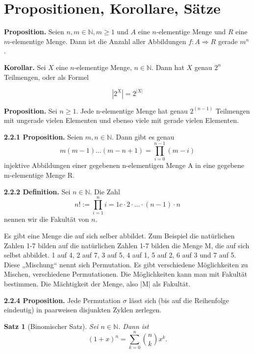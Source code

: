 \documentclass[12pt, twoside]{article}
\newcommand{\N}{\mathbb{N}}
\newtheorem{Sa}{Satz}[section]
\begin{document}
\section{Propositionen, Korollare, Sätze}
\textbf{Proposition.} Seien $n, m \in \N, m \ge 1$ und $A$ eine $n$-elementige Menge und $R$ eine $m$-elementige Menge. Dann ist die Anzahl aller Abbildungen $f:A \Rightarrow R$ gerade $m^n$.

\textbf{Korollar.} Sei $X$ eine $n$-elementige Menge, $n \in \N$. Dann hat $X$ genau $2^n$ Teilmengen, oder als Formel

$$|2^X|=2^{|X|}$$


\textbf{Proposition.} Sei  $n \ge 1$. Jede n-elementige Menge hat genau $2^{(n-1)}$ Teilmengen mit ungerade vielen Elementen und ebenso viele mit gerade vielen Elementen. 

\textbf{2.2.1 Proposition.} Seien $m, n \in \N $. Dann gibt es genau 
$$
m(m-1)\dots (m-n+1)= \prod_{i=0}^{n-1} (m-i)
$$
injektive Abbildungen einer gegebenen n-elementigen Menge A in eine gegebene m-elementige Menge R.

\textbf{2.2.2 Definition.} Sei $n \in \N$. Die Zahl
$$
n!:= \prod_{i=1}^{n}i=1c\cdot 2 \cdot \ldots \cdot(n-1)\cdot n
$$
nennen wir die Fakultät von $n$.


Es gibt eine Menge die auf sich selber abbildet. Zum Beispiel die natürlichen Zahlen 1-7 bilden auf die natürlichen Zahlen 1-7 bilden die Menge M, die auf sich selbst abbildet. 1 auf 4, 2  auf 7, 3 auf 5, 4 auf 1, 5 auf 2, 6 auf 3 und 7 auf 5. Diese „Mischung“ nennt sich Permutation.  Es gibt verschiedene Möglichkeiten zu Mischen, verschiedene Permutationen. Die Möglichkeiten kann man mit Fakultät bestimmen. Die Mächtigkeit der Menge, also |M| als Fakultät.

\textbf{2.2.4 Proposition.} Jede Permutation $\sigma$ lässt sich (bis auf die Reihenfolge eindeutig) in paarweisen disjunkten Zyklen zerlegen.
\begin{Sa}[Binomischer Satz]
Sei $n \in \N$. Dann ist
$$
(1+x)^n= \sum_{k=0}^{n} \binom{n}{k}x^k.
$$
\end{Sa}
\end{document}
